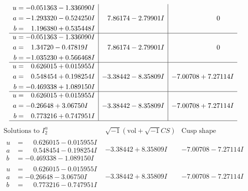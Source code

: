 \documentclass[1p]{elsarticle_modified}
\theoremstyle{definition}
\newcommand{\I}{\sqrt{-1}}
\begin{document}
$$\begin{array}{c|c|c}
\begin{aligned}
u &= -0.051363 - 1.336090 I \\
a &= -1.293320 - 0.524250 I \\
b &= \phantom{-}1.196380 + 0.535448 I\end{aligned}
 & \phantom{-}7.86174 - 2.79901 I & \phantom{-0.000000 } 0 \\ \hline\begin{aligned}
u &= -0.051363 - 1.336090 I \\
a &= \phantom{-}1.34720 - 0.47819 I \\
b &= -1.035230 + 0.566468 I\end{aligned}
 & \phantom{-}7.86174 - 2.79901 I & \phantom{-0.000000 } 0 \\ \hline\begin{aligned}
u &= \phantom{-}0.626015 + 0.015955 I \\
a &= \phantom{-}0.548454 + 0.198254 I \\
b &= -0.469338 + 1.089150 I\end{aligned}
 & -3.38442 - 8.35809 I & -7.00708 + 7.27114 I \\ \hline\begin{aligned}
u &= \phantom{-}0.626015 + 0.015955 I \\
a &= -0.26648 + 3.06750 I \\
b &= \phantom{-}0.773216 + 0.747951 I\end{aligned}
 & -3.38442 - 8.35809 I & -7.00708 + 7.27114 I\\
 \hline 
 \end{array}$$\newpage$$\begin{array}{c|c|c}  
\text{Solutions to }I^u_{2}& \I (\text{vol} + \sqrt{-1}CS) & \text{Cusp shape}\\
 \hline 
\begin{aligned}
u &= \phantom{-}0.626015 - 0.015955 I \\
a &= \phantom{-}0.548454 - 0.198254 I \\
b &= -0.469338 - 1.089150 I\end{aligned}
 & -3.38442 + 8.35809 I & -7.00708 - 7.27114 I \\ \hline\begin{aligned}
u &= \phantom{-}0.626015 - 0.015955 I \\
a &= -0.26648 - 3.06750 I \\
b &= \phantom{-}0.773216 - 0.747951 I\end{aligned}
 & -3.38442 + 8.35809 I & -7.00708 - 7.27114 I \\ \hline\begin{aligned}

\end{aligned}
\end{array}$$
\end{document}
